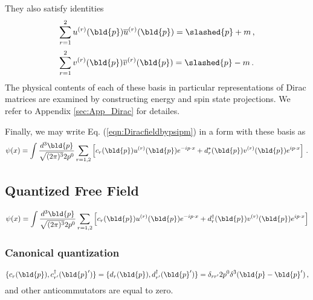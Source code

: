 They also satisfy identities
\begin{eqnarray}
\begin{array}{l}
\displaystyle
\sum_{r=1}^2 u^{(r)}(\bld{p}) 
\overline{u}^{(r)}(\bld{p})
=
\slashed{p} + m\,,
\vspace{2mm}
\\
\displaystyle
\sum_{r=1}^2 v^{(r)}(\bld{p}) 
\overline{v}^{(r)}(\bld{p})
=
\slashed{p} - m\,.
\end{array}
\label{eqn:DiracspinorPolSum}
\end{eqnarray}
The physical contents of each of these basis 
in particular representations of Dirac matrices
are examined by
constructing energy and spin state projections.
We refer to Appendix \ref{sec:App_Dirac} for detailes.

Finally, we may write Eq. (\ref{eqn:Diracfieldbypsipm})  in a form with these basis as
\begin{eqnarray}
\psi(x) = \int \frac{d^3 \bld{p}}{\sqrt{(2\pi)^3} 2 p^0}
\sum_{r = 1, 2} \left[
c_r(\bld{p}) u^{(r)}(\bld{p}) e^{-ip\cdot x} + d_r^*(\bld{p}) v^{(r)}(\bld{p}) e^{ip\cdot x}
\right] \,.
\end{eqnarray}

\subsection{Quantized Free Field}
\begin{equation}
\psi(x) 
=
\int \frac{d^3 \bld{p}}{\sqrt{(2\pi)^3} 2 p^0}
\sum_{r = 1,2}
\left[
c_r(\bld{p}) u^{(r)}(\bld{p}) e^{-ip \cdot x}
+
d_r^\dagger(\bld{p}) v^{(r)}(\bld{p}) e^{ip \cdot x}
\right]
\end{equation}

\subsubsection{Canonical quantization}

\begin{equation}
\{ c_{r}(\bld{p}), c_{r'}^\dagger(\bld{p}') \}
=
\{ d_{r}(\bld{p}), d_{r'}^\dagger(\bld{p}') \}
=
\delta_{rr'} 2p^0 
\delta^3(\bld{p} - \bld{p}')\,,
\label{eqn:Dirc_creann}
\end{equation}
and other anticommutators are equal to zero.

